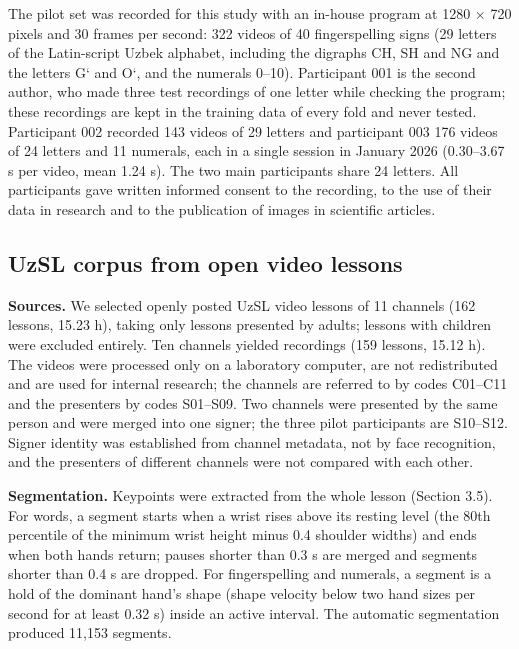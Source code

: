 \documentclass[a4paper,fleqn]{cas-dc}
\begin{document}
The pilot set was recorded for this study with an in-house program at 1280 $\times$ 720 pixels and 30 frames per second: 322 videos of 40 fingerspelling signs (29 letters of the Latin-script Uzbek alphabet, including the digraphs CH, SH and NG and the letters G‘ and O‘, and the numerals 0--10). Participant 001 is the second author, who made three test recordings of one letter while checking the program; these recordings are kept in the training data of every fold and never tested. Participant 002 recorded 143 videos of 29 letters and participant 003 176 videos of 24 letters and 11 numerals, each in a single session in January 2026 (0.30--3.67 s per video, mean 1.24 s). The two main participants share 24 letters. All participants gave written informed consent to the recording, to the use of their data in research and to the publication of images in scientific articles.

\hypertarget{uzsl-corpus-from-open-video-lessons}{%
\subsection{UzSL corpus from open video lessons}\label{uzsl-corpus-from-open-video-lessons}}

\textbf{Sources.} We selected openly posted UzSL video lessons of 11 channels (162 lessons, 15.23 h), taking only lessons presented by adults; lessons with children were excluded entirely. Ten channels yielded recordings (159 lessons, 15.12 h). The videos were processed only on a laboratory computer, are not redistributed and are used for internal research; the channels are referred to by codes C01--C11 and the presenters by codes S01--S09. Two channels were presented by the same person and were merged into one signer; the three pilot participants are S10--S12. Signer identity was established from channel metadata, not by face recognition, and the presenters of different channels were not compared with each other.

\textbf{Segmentation.} Keypoints were extracted from the whole lesson (Section 3.5). For words, a segment starts when a wrist rises above its resting level (the 80th percentile of the minimum wrist height minus 0.4 shoulder widths) and ends when both hands return; pauses shorter than 0.3 s are merged and segments shorter than 0.4 s are dropped. For fingerspelling and numerals, a segment is a hold of the dominant hand's shape (shape velocity below two hand sizes per second for at least 0.32 s) inside an active interval. The automatic segmentation produced 11,153 segments.
\end{document}
